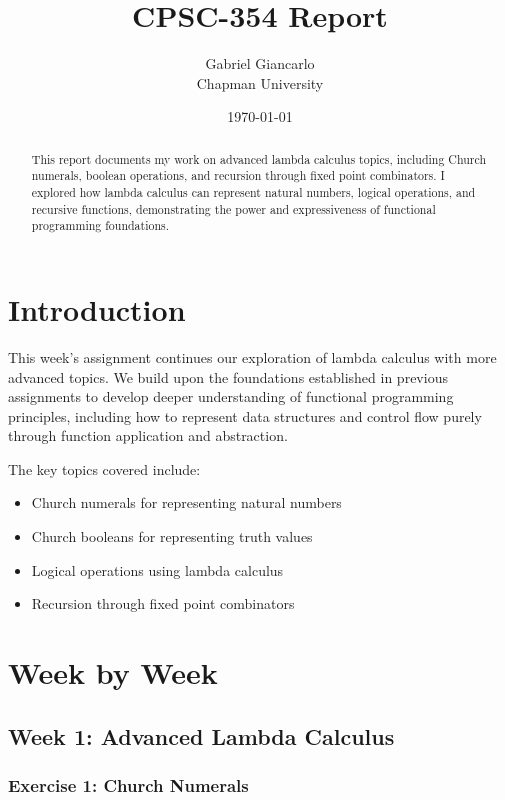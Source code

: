 \documentclass{article}
\title{CPSC-354 Report}
\author{Gabriel Giancarlo \\ Chapman University}
\date{\today}
\theoremstyle{plain}
\theoremstyle{definition}
\theoremstyle{remark}
\begin{document}
\maketitle

\begin{abstract}
This report documents my work on advanced lambda calculus topics, including Church numerals, boolean operations, and recursion through fixed point combinators. I explored how lambda calculus can represent natural numbers, logical operations, and recursive functions, demonstrating the power and expressiveness of functional programming foundations.
\end{abstract}

\setcounter{tocdepth}{3}
\tableofcontents

\section{Introduction}\label{intro}

This week's assignment continues our exploration of lambda calculus with more advanced topics. We build upon the foundations established in previous assignments to develop deeper understanding of functional programming principles, including how to represent data structures and control flow purely through function application and abstraction.

The key topics covered include:
\begin{itemize}
\item Church numerals for representing natural numbers
\item Church booleans for representing truth values
\item Logical operations using lambda calculus
\item Recursion through fixed point combinators
\end{itemize}

\section{Week by Week}\label{homework}

\subsection{Week 1: Advanced Lambda Calculus}

\subsubsection{Exercise 1: Church Numerals}
\end{document}
